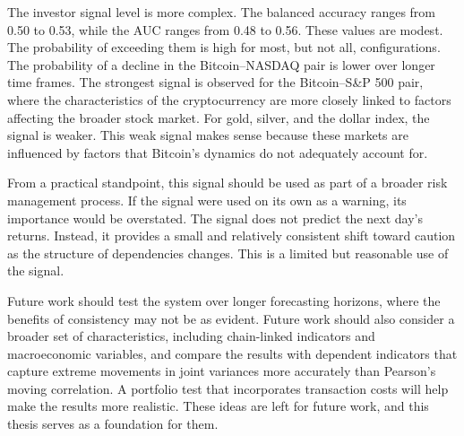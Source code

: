 The investor signal level is more complex. The balanced accuracy ranges from 0.50 to 0.53, while the AUC ranges from 0.48 to 0.56. These values are modest. The probability of exceeding them is high for most, but not all, configurations. The probability of a decline in the Bitcoin–NASDAQ pair is lower over longer time frames. The strongest signal is observed for the Bitcoin–S\&P 500 pair, where the characteristics of the cryptocurrency are more closely linked to factors affecting the broader stock market. For gold, silver, and the dollar index, the signal is weaker. This weak signal makes sense because these markets are influenced by factors that Bitcoin's dynamics do not adequately account for.

From a practical standpoint, this signal should be used as part of a broader risk management process. If the signal were used on its own as a warning, its importance would be overstated. The signal does not predict the next day's returns. Instead, it provides a small and relatively consistent shift toward caution as the structure of dependencies changes. This is a limited but reasonable use of the signal.

Future work should test the system over longer forecasting horizons, where the benefits of consistency may not be as evident. Future work should also consider a broader set of characteristics, including chain-linked indicators and macroeconomic variables, and compare the results with dependent indicators that capture extreme movements in joint variances more accurately than Pearson's moving correlation. A portfolio test that incorporates transaction costs will help make the results more realistic. These ideas are left for future work, and this thesis serves as a foundation for them.
